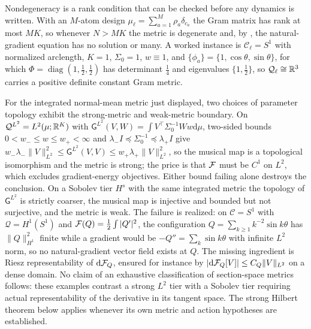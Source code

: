 Nondegeneracy is a rank condition that can be checked before any dynamics is
written.  With an $M$-atom design $\mu_\ell=\sum_{a=1}^M\rho_a\delta_{c_a}$ the
Gram matrix has rank at most $MK$, so whenever $N>MK$ the metric is degenerate
and, by , the natural-gradient
equation has no solution or many.  A worked instance is
$\mathcal C_\ell=S^1$ with normalized arclength, $K=1$, $\Sigma_0=1$,
$w\equiv1$, and $\{\phi_a\}=\{1,\cos\theta,\sin\theta\}$, for which
$\Phi=\operatorname{diag}(1,\tfrac12,\tfrac12)$ has determinant $\tfrac14$ and
eigenvalues $\{1,\tfrac12\}$, so $\mathcal Q_\ell\cong\mathbb R^3$ carries a positive
definite constant Gram metric.  

For the integrated normal-mean metric just displayed, two choices of
parameter topology exhibit the strong-metric and weak-metric boundary. On
$\mathcal Q^{L^2}=L^2(\mu;\mathbb R^K)$ with
$\mathsf G^{L^2}(V,W)=\int V^\top\Sigma_0^{-1}Ww\mathrm d\mu$, two-sided bounds
$0<w_-\leq w\leq w_+<\infty$ and
$\lambda_-I\preceq\Sigma_0^{-1}\preceq\lambda_+I$ give
$w_-\lambda_-\lVert V\rVert^2_{L^2}
\leq\mathsf G^{L^2}(V,V)\leq w_+\lambda_+\lVert V\rVert^2_{L^2}$, so the musical
map is a topological isomorphism and the metric is strong; the price is that
$\mathcal F$ must be $C^1$ on $L^2$, which excludes gradient-energy objectives.
Either bound failing alone destroys the conclusion.  On a Sobolev tier
$H^s$ with the same integrated metric the topology of $\mathsf G^{L^2}$ is
strictly coarser, the musical map is injective and bounded but not surjective,
and the metric is weak.  The failure is realized: on $\mathcal C=S^1$ with
$\mathcal Q=H^1(S^1)$ and $\mathcal F(Q)=\tfrac12\int|Q'|^2$, the configuration
$Q=\sum_{k\geq1}k^{-2}\sin k\theta$ has $\lVert Q\rVert^2_{H^1}$ finite while a
gradient would be $-Q''=\sum_k\sin k\theta$ with infinite $L^2$ norm, so no
natural-gradient vector field exists at $Q$.  The missing ingredient is Riesz
representability of $\mathrm d\mathcal F_Q$, ensured for instance by
$|\mathrm d\mathcal F_Q[V]|\leq C_Q\lVert V\rVert_{L^2}$ on a dense domain.  No
claim of an exhaustive classification of section-space metrics follows:
these examples contrast a strong $L^2$ tier with a Sobolev tier requiring
actual representability of the derivative in its tangent space. The strong
Hilbert theorem below applies whenever its own metric and action hypotheses
are established. 

